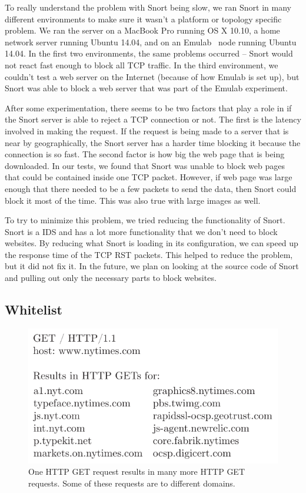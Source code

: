 To really understand the problem with Snort being slow, we ran Snort in many
different environments to make sure it wasn't a platform or topology specific
problem. We ran the server on a MacBook Pro running OS X 10.10, a home network
server running Ubuntu 14.04, and on an Emulab~\cite{emulab} node running Ubuntu
14.04. In the first two environments, the same problems occurred -- Snort would
not react fast enough to block all TCP traffic. In the third environment, we
couldn't test a web server on the Internet (because of how Emulab is set up),
but Snort was able to block a web server that was part of the Emulab
experiment.

After some experimentation, there seems to be two factors that play a role in
if the Snort server is able to reject a TCP connection or not. The first is the
latency involved in making the request. If the request is being made to a
server that is near by geographically, the Snort server has a harder time
blocking it because the connection is so fast. The second factor is how big the
web page that is being downloaded. In our tests, we found that Snort was unable
to block web pages that could be contained inside one TCP packet. However, if
web page was large enough that there needed to be a few packets to send the
data, then Snort could block it most of the time. This was also true with large
images as well.

To try to minimize this problem, we tried reducing the functionality of Snort.
Snort is a IDS and has a lot more functionality that we don't need to block
websites. By reducing what Snort is loading in its configuration, we can speed
up the response time of the TCP RST packets. This helped to reduce the problem,
but it did not fix it. In the future, we plan on looking at the source code of
Snort and pulling out only the necessary parts to block websites.


\subsection{Whitelist}

\begin{figure}[!t]
    \centering
    \includegraphics[width=\columnwidth]{figures/http_get}
    \caption{One HTTP GET request results in many more HTTP GET requests. Some
    of these requests are to different domains.}
    \label{fig:http_get}
\end{figure}

